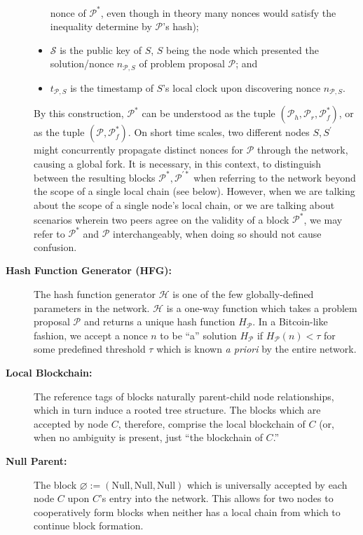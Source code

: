 \documentclass{article}
\begin{document}
\begin{description}
\begin{itemize}
				nonce of $\mathcal{P}^*$, even though in theory many nonces
				would satisfy the inequality determine by $\mathcal{P}$'s
				hash);
			\item $\mathcal{S}$ is the public key of $S$, $S$ being the node
				which presented the solution/nonce $n_{\mathcal{P},S}$ of
				problem proposal $\mathcal{P}$; and
			\item $t_{\mathcal{P},S}$ is the timestamp of $S$'s local clock
				upon discovering nonce $n_{\mathcal{P},S}$.
		\end{itemize}
		By this construction, $\mathcal{P}^*$ can be understood as the tuple
		$(\mathcal{P}_h,\mathcal{P}_r,\mathcal{P}^*_f)$, or as the tuple
		$(\mathcal{P},\mathcal{P}^*_f)$. On short time scales, two different
		nodes $S,S^\prime$ might concurrently propagate distinct nonces
		for $\mathcal{P}$ through the network, causing a global fork. It is
		necessary, in this context, to distinguish between the resulting blocks
		$\mathcal{P}^*,\mathcal{P}^{\prime *}$ when referring to the network
		beyond the scope of a single local chain (see below). However, when we
		are talking about the scope of a single node's local chain, or we are
		talking about scenarios wherein two peers agree on the validity of a
		block $\mathcal{P}^*$, we may refer to $\mathcal{P}^*$ and $\mathcal{P}$
		interchangeably, when doing so should not cause confusion.
	\item[\textbf{Hash Function Generator (HFG):}] The hash function generator $\mathcal{H}$
		is one of the few globally-defined parameters in the network. $\mathcal{H}$
		is a one-way function which takes a problem proposal $\mathcal{P}$ and
		returns a unique hash function $H_\mathcal{P}$. In a Bitcoin-like fashion,
		we accept a nonce $n$ to be ``a'' solution $H_\mathcal{P}$ if
		$H_\mathcal{P}(n)<\tau$ for some predefined threshold $\tau$
		which is known \textit{a priori} by the entire network.
	\item[\textbf{Local Blockchain:}] The reference tags of blocks naturally
		parent-child node relationships, which in turn induce a rooted tree
		structure. The blocks which are accepted by node $C$, therefore,
		comprise the local blockchain of $C$ (or, when no ambiguity is present,
		just ``the blockchain of $C$.''
	\item[\textbf{Null Parent:}] The block $\varnothing:=(\text{Null},\text{Null},\text{Null})$ which
		is universally accepted by each node $C$ upon $C$'s entry into the network.
		This allows for two nodes to cooperatively form blocks when neither has
		a local chain from which to continue block formation.
\end{description}
\end{document}
